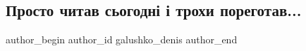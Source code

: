  
 
 
 
 

\subsection{ Просто читав сьогодні і трохи пореготав...}
\label{sec:12_10_2022.fb.galushko_denis.1._prosto_chitav_sogod}

\ifcmt
 author_begin
   author_id galushko_denis
 author_end
\fi
